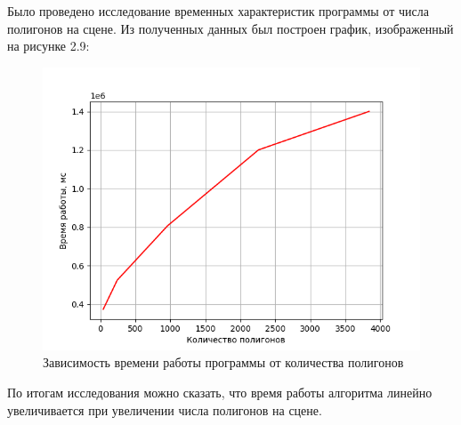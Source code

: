 Было проведено исследование временных характеристик программы от числа полигонов на сцене. Из полученных данных был построен график, изображенный на рисунке 2.9:
\begin{figure}[H]
	\begin{center}
		\includegraphics[scale=1]{images/result}
	\end{center}
	\captionsetup{justification=centering}
	\caption{Зависимость времени работы программы от количества полигонов}
	\label{img:s1}
\end{figure}
По итогам исследования можно сказать, что время работы алгоритма линейно увеличивается при увеличении числа полигонов на сцене.